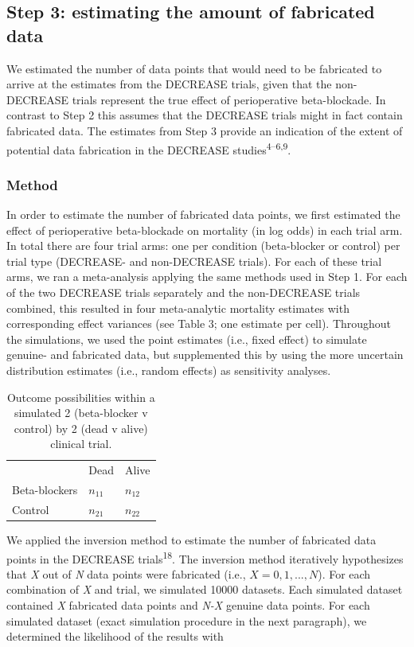 \documentclass[]{article}
\begin{document}
\subsection{Step 3: estimating the amount of fabricated
data}\label{step-3-estimating-the-amount-of-fabricated-data}

We estimated the number of data points that would need to be fabricated
to arrive at the estimates from the DECREASE trials, given that the
non-DECREASE trials represent the true effect of perioperative
beta-blockade. In contrast to Step 2 this assumes that the DECREASE
trials might in fact contain fabricated data. The estimates from Step 3
provide an indication of the extent of potential data fabrication in the
DECREASE studies\textsuperscript{4--6,9}.

\subsubsection{Method}\label{method-1}

In order to estimate the number of fabricated data points, we first
estimated the effect of perioperative beta-blockade on mortality (in log
odds) in each trial arm. In total there are four trial arms: one per
condition (beta-blocker or control) per trial type (DECREASE- and
non-DECREASE trials). For each of these trial arms, we ran a
meta-analysis applying the same methods used in Step 1. For each of the
two DECREASE trials separately and the non-DECREASE trials combined,
this resulted in four meta-analytic mortality estimates with
corresponding effect variances (see Table 3; one estimate per cell).
Throughout the simulations, we used the point estimates (i.e., fixed
effect) to simulate genuine- and fabricated data, but supplemented this
by using the more uncertain distribution estimates (i.e., random
effects) as sensitivity analyses.

\begin{longtable}[]{@{}lll@{}}
\caption{Outcome possibilities within a simulated 2 (beta-blocker v
control) by 2 (dead v alive) clinical trial.}\tabularnewline
\toprule
& Dead & Alive\tabularnewline
Beta-blockers & \(n_{11}\) & \(n_{12}\)\tabularnewline
Control & \(n_{21}\) & \(n_{22}\)\tabularnewline
\bottomrule
\end{longtable}

We applied the inversion method to estimate the number of fabricated
data points in the DECREASE trials\textsuperscript{18}. The inversion
method iteratively hypothesizes that \emph{X} out of \emph{N} data
points were fabricated (i.e., \(X={0, 1, ..., N}\)). For each
combination of \emph{X} and trial, we simulated 10000 datasets. Each
simulated dataset contained \emph{X} fabricated data points and
\emph{N-X} genuine data points. For each simulated dataset (exact
simulation procedure in the next paragraph), we determined the
likelihood of the results with
\end{document}
